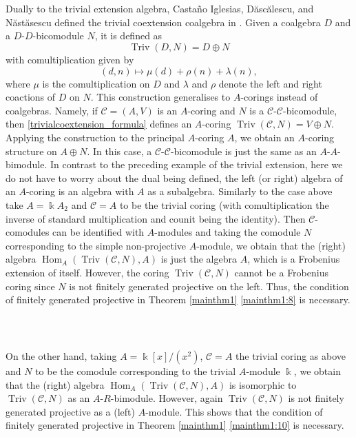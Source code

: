 \documentclass[12pt,a4paper]{amsart}
\theoremstyle{plain}
\theoremstyle{definition}
\numberwithin{equation}{thm}
\DeclareMathOperator{\Hom}{Hom}
\DeclareMathOperator{\Triv}{Triv}
\begin{document}
\subsubsection{~} Dually to the trivial extension algebra, Casta\~no Iglesias, D\u asc\u alescu, and N\u ast\u asescu defined the trivial coextension coalgebra in \cite[Section 4]{CDN04}. Given a coalgebra $D$ and a $D$-$D$-bicomodule $N$, it is defined as 
\[\Triv(D,N)=D\oplus N\]
with comultiplication given by 
\begin{equation}
(d,n)\longmapsto \mu(d)+\rho(n)+\lambda(n),\label{trivialcoextension_formula}
\end{equation}
where $\mu$ is the comultiplication on $D$ and $\lambda$ and $\rho$ denote the left and right coactions of $D$ on $N$. This construction generalises to $A$-corings instead of coalgebras. Namely, if $\mathcal{C}=(A,V)$ is an $A$-coring and $N$ is a $\mathcal{C}$-$\mathcal{C}$-bicomodule, then \eqref{trivialcoextension_formula} defines an $A$-coring $\Triv(\mathcal{C},N)=V\oplus N$. Applying the construction to the principal $A$-coring $A$, we obtain an $A$-coring structure on $A\oplus N$. In this case, a $\mathcal{C}$-$\mathcal{C}$-bicomodule is just the same as an $A$-$A$-bimodule. In contrast to the preceding example of the trivial extension, here we do not have to worry about the dual being defined, the left (or right) algebra of an $A$-coring is an algebra with $A$ as a subalgebra. 
Similarly to the case above take $A=\Bbbk A_2$ and $\mathcal{C}=A$ to be the trivial coring (with comultiplication the inverse of standard multiplication and counit being the identity). Then $\mathcal{C}$-comodules can be identified with $A$-modules and taking the comodule $N$ corresponding to the simple non-projective $A$-module, we obtain that the (right) algebra $\Hom_A(\Triv(\mathcal{C},N),A)$ is just the algebra $A$, which is a Frobenius extension of itself. However, the coring $\Triv(\mathcal{C},N)$ cannot be a Frobenius coring since $N$ is not finitely generated projective on the left. Thus, the condition of finitely generated projective in Theorem \ref{mainthm1} \eqref{mainthm1:8} is necessary.

\subsubsection{~} On the other hand, taking $A=\Bbbk[x]/(x^2)$, $\mathcal{C}=A$ the trivial coring as above and $N$ to be the comodule corresponding to the trivial $A$-module $\Bbbk$, we obtain that the (right) algebra $\Hom_A(\Triv(\mathcal{C},N),A)$ is isomorphic to $\Triv(\mathcal{C},N)$ as an $A$-$R$-bimodule. However, again $\Triv(\mathcal{C},N)$ is not finitely generated projective as a (left) $A$-module. This shows that the condition of finitely generated projective in Theorem \ref{mainthm1} \eqref{mainthm1:10} is necessary. 
\end{document}
